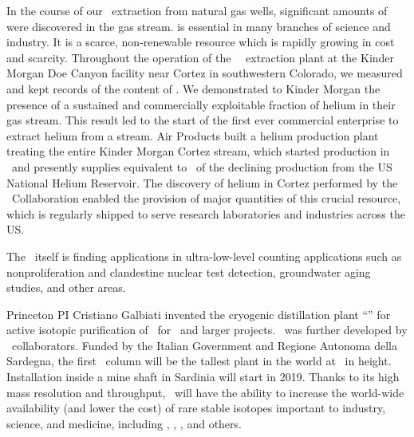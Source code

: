\begin{compactitem}

\item In the course of our \UAr\ extraction from natural gas wells, significant amounts of  were discovered in the gas stream.   is essential in many branches of science and industry. It is a scarce, non-renewable resource which is rapidly growing in cost and scarcity.  Throughout the operation of the  \DSfs\ \UAr\ extraction plant at the Kinder Morgan Doe Canyon  facility near Cortez in southwestern Colorado, we measured and kept records of the content of .  We demonstrated to Kinder Morgan the presence of a sustained and commercially exploitable fraction of helium in their gas stream.  This result led to the start of the first ever commercial enterprise to extract helium from a  stream.  Air Products built a helium production plant treating the entire Kinder Morgan Cortez  stream, which started production in \UraniaHeStartDate\ and presently supplies  equivalent to \UraniaHeNationalReserveFractionEquivalentRate\ of the declining production from the US National Helium Reservoir.  The discovery of helium in Cortez performed by the \GADMC\ Collaboration enabled the provision of major quantities of this crucial resource, which is regularly shipped to serve research laboratories and industries across the US.

\item The \UAr\ itself is finding applications in ultra-low-level counting applications such as nonproliferation and clandestine nuclear test detection, groundwater aging studies, and other areas.

\item Princeton PI Cristiano Galbiati invented the cryogenic distillation plant ``\Aria'' for active isotopic purification of \UAr\ for \DSks\ and larger projects.  \Aria\ was further developed by \DSfs\ collaborators.  Funded by the Italian Government and Regione Autonoma della Sardegna, the first \Aria\ column will be the tallest plant in the world at \AriaSeruciHeight\ in height.  Installation inside a mine shaft in Sardinia will start in 2019. Thanks to its high mass resolution and throughput, \Aria\ will have the ability to increase the world-wide availability (and lower the cost) of rare stable isotopes important to industry, science, and medicine, including , , , and others.


\end{compactitem}
